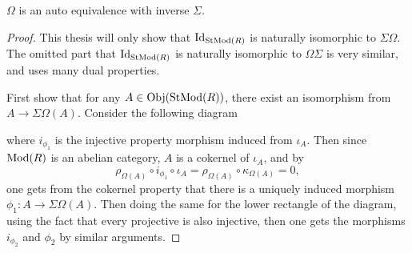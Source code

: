 \begin{theorem}
    \( \Omega \) is an auto equivalence with inverse \( \Sigma \).
\end{theorem}
\begin{proof}
    This thesis will only show that \( \operatorname{Id}_{\operatorname{StMod}(R)} \) is naturally isomorphic to \( \Sigma\Omega \). The omitted part that \( \operatorname{Id}_{\operatorname{StMod}(R)} \) is naturally isomorphic to \( \Omega\Sigma \) is very similar, and uses many dual properties.

    First show that for any \( A \in \operatorname{Obj}(\operatorname{StMod}(R)) \), there exist an isomorphism from \( A \to \Sigma\Omega(A) \). Consider the following diagram
    \begin{center}
    \end{center}
    where \( i_{\phi_1} \) is the injective property morphism induced from \( \iota_A \). Then since \( \operatorname{Mod}(R) \) is an abelian category, \( A \) is a cokernel of \( \iota_A \), and by
    \[
        \rho_{\Omega(A)} \circ i_{\phi_1} \circ \iota_A = \rho_{\Omega(A)} \circ \kappa_{\Omega(A)} = 0,
    \]
    one gets from the cokernel property that there is a uniquely induced morphism \( \phi_1: A \to \Sigma\Omega(A) \). Then doing the same for the lower rectangle of the diagram, using the fact that every projective is also injective, then one gets the morphisms \( i_{\phi_2} \) and \( \phi_2 \) by similar arguments.


\end{proof}
